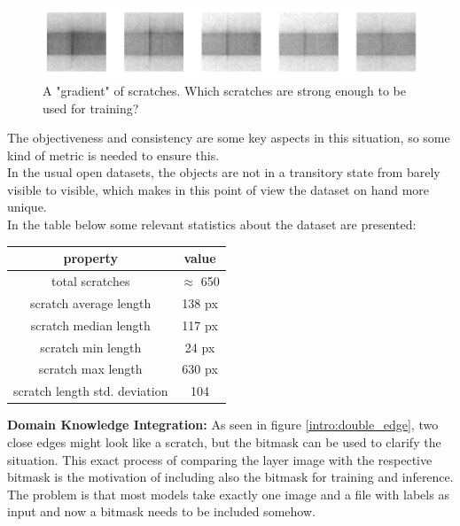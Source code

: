 \begin{figure}[!h]
\centering
\captionsetup{justification=centering,margin=2cm}
\includegraphics[width=\columnwidth]{images/introduction/original_scratch_fades}
\caption{A "gradient" of scratches. Which scratches are strong enough to be used for training?}
\label{intro:original_scratch_fades}
\end{figure}

The objectiveness and consistency are some key aspects in this situation, so some kind of metric is needed to ensure this.\\
In the usual open datasets, the objects are not in a transitory state from barely visible to visible, which makes in this point of view the dataset on hand more unique. \\
In the table below some relevant statistics about the dataset are presented:
\begin{center}
\begin{tabular}{ ||c|c|| }
\hline
property & value \\ [0.5ex]
\hline\hline
total scratches & $\approx$ 650 \\
scratch average length & 138 px \\
scratch median length & 117 px \\
scratch min length & 24 px \\
scratch max length & 630 px \\
scratch length std. deviation & 104 \\

\hline
\end{tabular}
\end{center}


\textbf{Domain Knowledge Integration:}
As seen in figure \ref{intro:double_edge}, two close edges might look like a scratch, but the bitmask can be used to clarify the situation. This exact process of comparing the layer image with the respective bitmask is the motivation of including also the bitmask for training and inference. The problem is that most models take exactly one image and a file with labels as input and now a bitmask needs to be included somehow.\\

